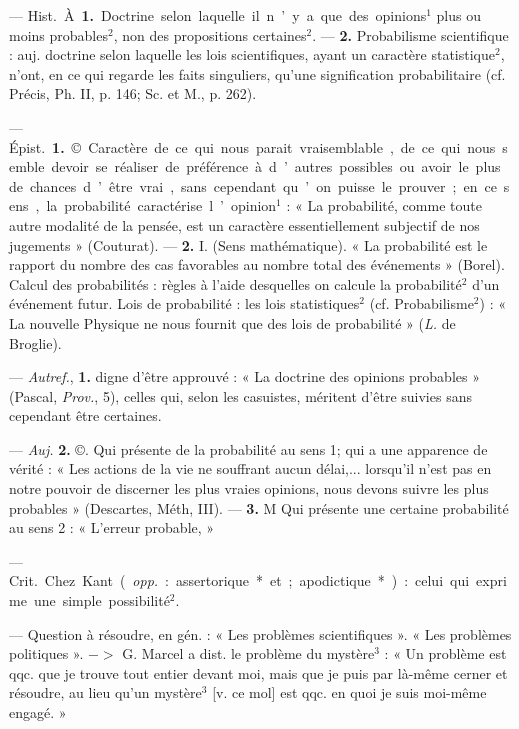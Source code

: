 \begin{itemize}[leftmargin=1cm, label=, itemsep=1pt]
 — \si{Hist.} À. {\bf 1.} Doctrine
selon laquelle il n’y a que des opinions$^1$ plus ou moins probables$^2$, non
des propositions certaines$^2$. — {\bf 2.}
Probabilisme scientifique : auj. doctrine selon laquelle les lois scientifiques, ayant un caractère statistique$^2$, n’ont, en ce qui regarde les
faits singuliers, qu'une signification probabilitaire (cf. Précis, Ph. II,
p. 146; Sc. et M., p. 262).

 — \si{Épist.} {\bf 1.} ©. Caractère
de ce qui nous parait vraisemblable,
de ce qui nous semble devoir se
réaliser de préférence à d’autres
possibles ou avoir le plus de chances
d’être vrai, sans cependant qu’on
puisse le prouver; en ce sens, la
probabilité caractérise l’opinion$^1$ :
« La probabilité, comme toute autre
modalité de la pensée, est un caractère essentiellement subjectif de nos
jugements » (Couturat). — {\bf 2.} I.
(Sens mathématique). « La probabilité est le rapport du nombre des
cas favorables au nombre total des
événements » (Borel). Calcul des
probabilités : règles à l'aide desquelles on calcule la probabilité$^2$
d’un événement futur. Lois de probabilité : les lois statistiques$^2$ (cf.
Probabilisme$^2$) : « La nouvelle Physique ne nous fournit que des lois de
probabilité » ({\it L.} de Broglie).

 — {\it Autref.}, {\bf 1.} digne d'être
approuvé : « La doctrine des opinions probables » (Pascal, {\it Prov.}, 5),
celles qui, selon les casuistes, méritent d’être suivies sans cependant
être certaines.

— {\it Auj.} {\bf 2.} ©. Qui présente de la
probabilité au sens 1; qui a une
apparence de vérité : « Les actions
de la vie ne souffrant aucun délai,...
lorsqu'il n’est pas en notre pouvoir
de discerner les plus vraies opinions,
nous devons suivre les plus probables » (Descartes, Méth, III). —
 {\bf 3.} M Qui présente une certaine probabilité au sens 2 : « L'erreur probable, »

 — \si{Crit.}
Chez Kant ({\it opp.} : assertorique* et ;
apodictique*) : celui qui exprime une
simple possibilité$^2$.

 — Question à résoudre, en
gén. : « Les problèmes scientifiques ».
« Les problèmes politiques ». $->$
G. Marcel a dist. le problème du
mystère$^3$ : « Un problème est qqc. que
je trouve tout entier devant moi,
mais que je puis par là-même cerner
et résoudre, au lieu qu’un mystère$^3$
[v. ce mol] est qqc. en quoi je suis
moi-même engagé. »


\end{itemize}
